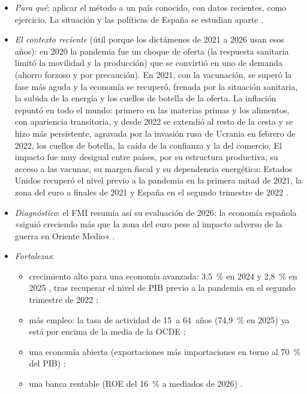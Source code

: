 \documentclass[11pt]{article}
\begin{document}
\begin{itemize}
\item \emph{Para qué}: aplicar el método a un país conocido, con datos recientes, como ejercicio. La situación y las políticas de España se estudian aparte .
\item \emph{El contexto reciente} (útil porque los dictámenes de 2021 a 2026 usan esos años): en 2020 la pandemia fue un choque de oferta (la respuesta sanitaria limitó la movilidad y la producción) que se convirtió en uno de demanda (ahorro forzoso y por precaución). En 2021, con la vacunación, se superó la fase más aguda y la economía se recuperó, frenada por la situación sanitaria, la subida de la energía y los cuellos de botella de la oferta. La inflación repuntó en todo el mundo: primero en las materias primas y los alimentos, con apariencia transitoria, y desde 2022 se extendió al resto de la cesta y se hizo más persistente, agravada por la invasión rusa de Ucrania en febrero de 2022, los cuellos de botella, la caída de la confianza y la del comercio. El impacto fue muy desigual entre países, por su estructura productiva, su acceso a las vacunas, su margen fiscal y su dependencia energética: Estados Unidos recuperó el nivel previo a la pandemia en la primera mitad de 2021, la zona del euro a finales de 2021 y España en el segundo trimestre de 2022 \parencite{BEA2026GDP,Eurostat2026namq10gdp}.
\item \emph{Diagnóstico}: el FMI resumía así su evaluación de 2026: la economía española «siguió creciendo más que la zona del euro pese al impacto adverso de la guerra en Oriente Medio» \parencite{FMI2026ArticuloIV}.
\item \emph{Fortalezas}:
  \begin{itemize}
  \item crecimiento alto para una economía avanzada: 3,5~\% en 2024 y 2,8~\% en 2025 \parencite{FMI2026ArticuloIV}, tras recuperar el nivel de PIB previo a la pandemia en el segundo trimestre de 2022 \parencite{Eurostat2026namq10gdp};
  \item más empleo: la tasa de actividad de 15~a 64~años (74,9~\% en 2025) ya está por encima de la media de la OCDE \parencite{Eurostat2026lfsa,OCDE2026LFS};
  \item una economía abierta (exportaciones más importaciones en torno al 70~\% del PIB) \parencite{Eurostat2026nama10gdp};
  \item una banca rentable (ROE del 16~\% a mediados de 2026) \parencite{BdE2026EstadSupervisoras}.
  \end{itemize}

\end{itemize}
\end{document}

